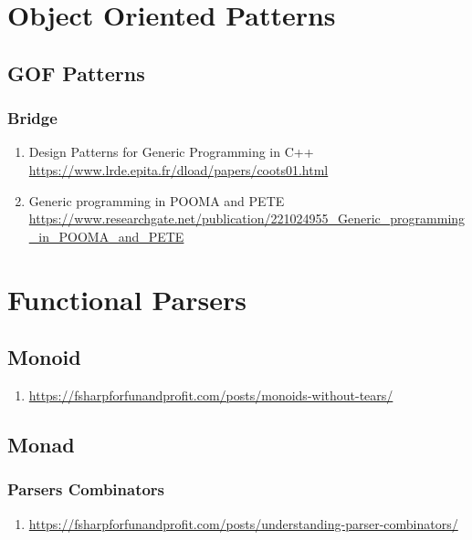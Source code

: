 \documentclass[10pt,a4paper]{article}
\begin{document}
	
\section{Object Oriented Patterns}
\subsection{GOF Patterns}
\subsubsection{Bridge}
\begin{enumerate}
	\item {Design Patterns for Generic Programming in C++\\ \url{https://www.lrde.epita.fr/dload/papers/coots01.html}}
	\item {Generic programming in POOMA and PETE\\ \url{https://www.researchgate.net/publication/221024955_Generic_programming_in_POOMA_and_PETE}}
\end{enumerate}

\section{Functional Parsers}
\subsection{Monoid}
\begin{enumerate}
	\item {\url{https://fsharpforfunandprofit.com/posts/monoids-without-tears/}}
\end{enumerate}

\subsection{Monad}
\subsubsection{Parsers Combinators}
\begin{enumerate}
	\item {\url{https://fsharpforfunandprofit.com/posts/understanding-parser-combinators/}}
\end{enumerate}
\end{document}
